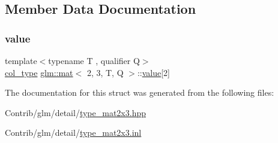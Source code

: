 \subsection{Member Data Documentation}
\mbox{\label{structglm_1_1mat_3_012_00_013_00_01_t_00_01_q_01_4_a6ffb5e68032090a7980ff22e64eff8cf}} 
\subsubsection{\texorpdfstring{value}{value}}
{\footnotesize\ttfamily template$<$typename T , qualifier Q$>$ \\
\mbox{\hyperlink{structglm_1_1mat_3_012_00_013_00_01_t_00_01_q_01_4_aebe4faf14ea1bc3092b4bbf591d7194e}{col\+\_\+type}} \mbox{\hyperlink{structglm_1_1mat}{glm\+::mat}}$<$ 2, 3, T, Q $>$\+::\mbox{\hyperlink{_s_d_l__opengl__glext_8h_a8ad81492d410ff2ac11f754f4042150f}{value}}\mbox{[}2\mbox{]}\hspace{0.3cm}{\ttfamily [private]}}



The documentation for this struct was generated from the following files\+:\begin{DoxyCompactItemize}
\item 
Contrib/glm/detail/\mbox{\hyperlink{type__mat2x3_8hpp}{type\+\_\+mat2x3.\+hpp}}\item 
Contrib/glm/detail/\mbox{\hyperlink{type__mat2x3_8inl}{type\+\_\+mat2x3.\+inl}}\end{DoxyCompactItemize}
